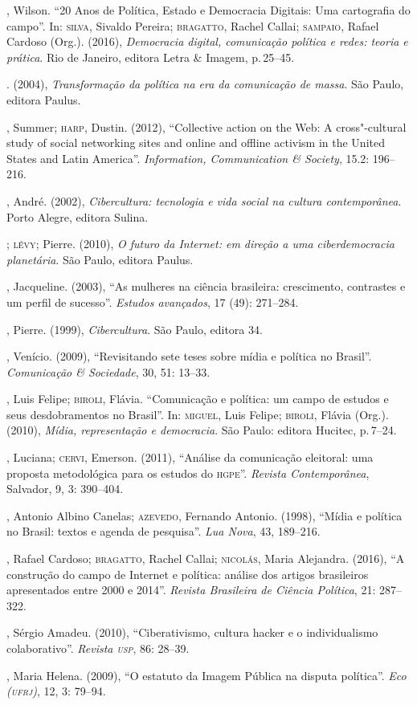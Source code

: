 \begin{bibliohedra}
, Wilson. ``20 Anos de Política, Estado e Democracia Digitais: Uma
cartografia do campo''. In: \textsc{silva}, Sivaldo Pereira; \textsc{bragatto}, Rachel
Callai; \textsc{sampaio}, Rafael Cardoso (Org.). (2016), \emph{Democracia
digital, comunicação política e redes: teoria e prática}. Rio
de Janeiro, editora Letra \& Imagem, p.\,25--45.

\titidem. (2004), \emph{Transformação da política na era da
comunicação de massa}. São Paulo, editora Paulus.

, Summer; \textsc{harp}, Dustin. (2012), ``Collective action on the Web: A
cross"-cultural study of social networking sites and online and offline
activism in the United States and Latin America''. \emph{Information,
Communication \& Society}, 15.2: 196--216.

, André. (2002), \emph{Cibercultura: tecnologia e vida social na
cultura contemporânea}. Porto Alegre, editora Sulina.

\titidem; \textsc{lévy}; Pierre. (2010), \emph{O futuro da Internet: em
direção a uma ciberdemocracia planetária}. São Paulo, editora Paulus.

, Jacqueline. (2003), ``As mulheres na ciência brasileira:
crescimento, contrastes e um perfil de sucesso''. \emph{Estudos
avançados}, 17 (49): 271--284.

, Pierre. (1999), \emph{Cibercultura}. São Paulo, editora 34.

, Venício. (2009), ``Revisitando sete teses sobre mídia e política
no Brasil''. \emph{Comunicação \& Sociedade}, 30, 51: 13--33.

, Luis Felipe; \textsc{biroli}, Flávia. ``Comunicação e política: um campo
de estudos e seus desdobramentos no Brasil''. In: \textsc{miguel}, Luis Felipe;
\textsc{biroli}, Flávia (Org.). (2010), \emph{Mídia, representação e democracia}.
São Paulo: editora Hucitec, p.\,7--24.

, Luciana; \textsc{cervi}, Emerson. (2011), ``Análise da comunicação
eleitoral: uma proposta metodológica para os estudos do \textsc{hgpe}''.
\emph{Revista Contemporânea}, Salvador, 9, 3: 390--404.

, Antonio Albino Canelas; \textsc{azevedo}, Fernando Antonio. (1998),
``Mídia e política no Brasil: textos e agenda de pesquisa''. \emph{Lua
Nova}, 43, 189--216.

, Rafael Cardoso; \textsc{bragatto}, Rachel Callai; \textsc{nicolás}, Maria
Alejandra. (2016), ``A construção do campo de Internet e política:
análise dos artigos brasileiros apresentados entre 2000 e 2014''.
\emph{Revista Brasileira de Ciência Política}, 21: 287--322.

, Sérgio Amadeu. (2010), ``Ciberativismo, cultura hacker e o
individualismo colaborativo''. \emph{Revista \textsc{usp}}, 86: 28--39.

, Maria Helena. (2009), ``O estatuto da Imagem Pública na disputa
política''. \emph{Eco (\textsc{ufrj})}, 12, 3: 79--94.
\end{bibliohedra}
